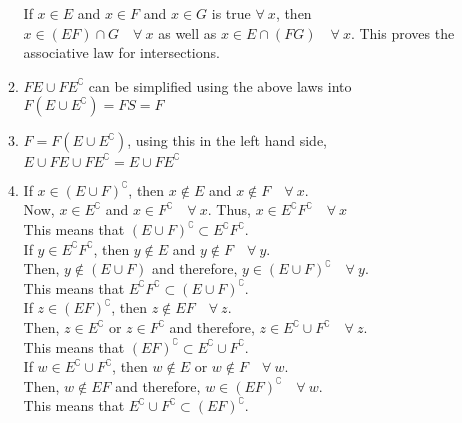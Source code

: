 \begin{enumerate}
\begin{enumerate}
		If $ x \in E $ and $ x \in F $ and $ x \in G $ is true $ \forall \ x $, then \\
		$ x \in (E F) \cap G \quad \forall \ x$ as well as $ x \in E \cap (F G) \quad \forall \ x$.
		This proves the associative law for intersections. \\
		
		\item $ FE \cup FE^\complement $ can be simplified using the above laws into \\
		$ F (E \cup E^\complement) = F S = F$ \\
		
		\item $ F = F (E \cup E^\complement) $, using this in the left hand side, \\
		$ E \cup FE \cup FE^\complement = E \cup F E^\complement$ \\
		
		\item If $ x \in (E \cup F)^\complement $, then $ x \notin E $ and $ x \notin F  \quad \forall \ x$. \\
		Now, $ x \in E^\complement $ and $ x \in F^\complement  \quad \forall \ x$. Thus, $ x \in E^\complement F^\complement \quad \forall \ x $ \\
		This means that $ (E \cup F)^\complement \subset E^\complement F^\complement $. \\
		
		If $ y \in E^\complement F^\complement $, then $ y \notin E $ and $ y \notin F \quad \forall \ y$. \\
		Then, $ y \notin (E \cup F) $ and therefore, $ y \in (E \cup F)^\complement \quad \forall \ y$. \\
		This means that $  E^\complement F^\complement \subset (E \cup F)^\complement $. \\
		
		If $ z \in (EF)^\complement $, then $ z \notin EF \quad \forall \ z$. \\
		Then, $ z \in E^\complement$ or $ z \in F^\complement $ and therefore, $ z \in E^\complement \cup F^\complement \quad \forall \ z$. \\
		This means that $  (EF)^\complement \subset E^\complement \cup F^\complement $. \\
		
		If $ w \in E^\complement \cup F^\complement $, then $ w \notin E $ or $ w \notin F \quad \forall \ w$. \\
		Then, $ w \notin EF $ and therefore, $ w \in (EF)^\complement  \quad \forall \ w$. \\
		This means that $ E^\complement \cup F^\complement \subset (EF)^\complement$. \\
		

\end{enumerate}
\end{enumerate}
